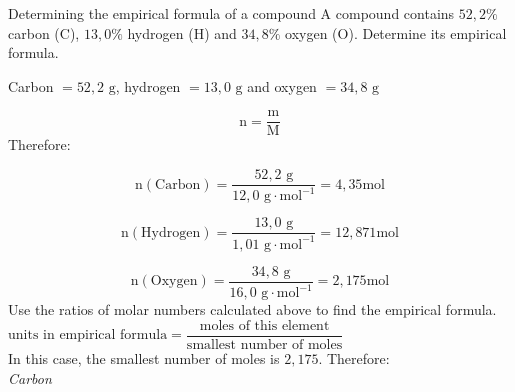     \noindent
\label{m38712*secfhsst!!!underscore!!!id1029}
      \noindent 
      \begin{wex}{Determining the empirical formula of a compound }{
A compound contains $52,2\%$ carbon ($\text{C}$), $13,0\%$ hydrogen ($\text{H}$) and $34,8\%$ oxygen ($\text{O}$). Determine its empirical formula.      
}
{ %
      \label{m38712*id280928}Carbon $=52,2 \text{ g}$, hydrogen $=13,0 \text{ g}$ and oxygen $=34,8 \text{ g}$ 
      \label{m38712*id280954}\nopagebreak\noindent{}
        
    \begin{equation*}
    \text{n}=\frac{\text{m}}{\text{M}}
      \end{equation*}
      \label{m38712*id280975}Therefore: 
      \label{m38712*id280978}\nopagebreak\noindent{}
        
    \begin{equation*}
    \text{n}\left(\text{Carbon}\right)=\frac{52,2 \text{ g}}{12,0 \text{ g} \cdot \text{mol}^{-1}}=4,35\text{mol}
      \end{equation*}
      \label{m38712*id281042}\nopagebreak\noindent{}
        
    \begin{equation*}
    \text{n}\left(\text{Hydrogen}\right)=\frac{13,0 \text{ g}}{1,01 \text{ g} \cdot \text{mol}^{-1}}=12,871\text{mol}
      \end{equation*}
      \label{m38712*id281111}\nopagebreak\noindent{}
        
    \begin{equation*}
    \text{n}\left(\text{Oxygen}\right)=\frac{34,8 \text{ g}}{16,0 \text{ g} \cdot \text{mol}^{-1}}=2,175\text{mol}
      \end{equation*}
Use the ratios of molar numbers calculated above to find the empirical formula.\newline \\
$\text{units in empirical formula} = \dfrac{\text{moles of this element}}{\text{smallest number of moles}}$\newline \\
In this case, the smallest number of moles is $2,175$. Therefore:\\ 
      \label{m38712*id281179}
        \textsl{Carbon}
 
      \label{m38712*id281185}\nopagebreak\noindent{}
        
}
\end{wex}
